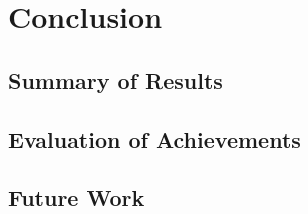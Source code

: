 \chapter{Conclusion}

\section{Summary of Results}
\section{Evaluation of Achievements}
\section{Future Work}
